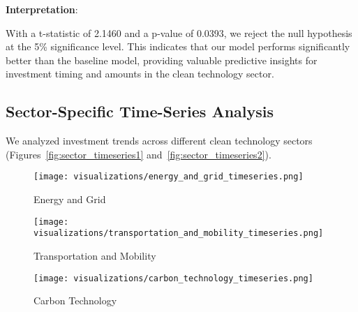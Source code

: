 \documentclass[sigconf]{acmart}
\begin{document}
\textbf{Interpretation}:

With a t-statistic of 2.1460 and a p-value of 0.0393, we reject the null hypothesis at the 5\% significance level. This indicates that our model performs significantly better than the baseline model, providing valuable predictive insights for investment timing and amounts in the clean technology sector.

\subsection{Sector-Specific Time-Series Analysis}

We analyzed investment trends across different clean technology sectors (Figures~\ref{fig:sector_timeseries1} and~\ref{fig:sector_timeseries2}).

\begin{figure*}[htpb]
    \centering
    \begin{subfigure}[t]{0.32\textwidth}
        \texttt{[image: visualizations/energy\_and\_grid\_timeseries.png]}
        \caption{Energy and Grid}
    \end{subfigure}
    \hfill
    \begin{subfigure}[t]{0.32\textwidth}
        \texttt{[image: visualizations/transportation\_and\_mobility\_timeseries.png]}
        \caption{Transportation and Mobility}
    \end{subfigure}
    \hfill
    \begin{subfigure}[t]{0.32\textwidth}
        \texttt{[image: visualizations/carbon\_technology\_timeseries.png]}
        \caption{Carbon Technology}
    \end{subfigure}
    \caption{Time-Series of Investment Amounts by Sector (Part 1)}
    \label{fig:sector_timeseries1}
\end{figure*}
\end{document}
